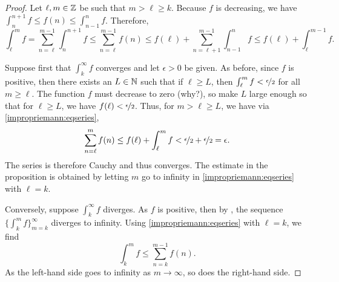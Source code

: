 \begin{proof}
Let $\ell, m \in {\mathbb{Z}}$ be such that $m > \ell \geq k$.
Because $f$ is decreasing, we have
$\int_{n}^{n+1} f \leq f(n) \leq \int_{n-1}^{n} f$.  Therefore,
\begin{equation} \label{impropriemann:eqseries}
\int_\ell^m f
=
\sum_{n=\ell}^{m-1} \int_{n}^{n+1} f
\leq
\sum_{n=\ell}^{m-1} f(n)
\leq
f(\ell) +
\sum_{n=\ell+1}^{m-1} \int_{n-1}^{n} f
\leq
f(\ell)+
\int_\ell^{m-1} f .
\end{equation}

Suppose first that $\int_k^\infty f$ converges and
let $\epsilon > 0$ be given.
As before, since $f$ is positive, then there exists
an $L \in {\mathbb{N}}$ such that if $\ell \geq L$, then
$\int_\ell^{m} f < \nicefrac{\epsilon}{2}$ for all $m \geq \ell$.
The function 
$f$ must decrease to zero (why?), so make $L$ large enough so that
for $\ell \geq L$, we have $f(\ell) < \nicefrac{\epsilon}{2}$.
Thus, for $m > \ell \geq L$, we have
via \eqref{impropriemann:eqseries},
\begin{equation*}
\sum_{n=\ell}^{m} f(n)
\leq
f(\ell)+
\int_\ell^{m} f < \nicefrac{\epsilon}{2} + \nicefrac{\epsilon}{2} = \epsilon .
\end{equation*}
The series is therefore Cauchy and thus converges.  The estimate in the
proposition is obtained by letting $m$ go to infinity in
\eqref{impropriemann:eqseries} with $\ell = k$.

Conversely, suppose $\int_k^\infty f$ diverges.  
As $f$ is positive, then by
,
the sequence $\{ \int_k^m f \}_{m=k}^\infty$ diverges to infinity.
Using
\eqref{impropriemann:eqseries} with $\ell = k$, we find
\begin{equation*}
\int_k^m f
\leq
\sum_{n=k}^{m-1} f(n) .
\end{equation*}
As the left-hand side goes to infinity as $m \to \infty$, so does the
right-hand side.
\end{proof}

